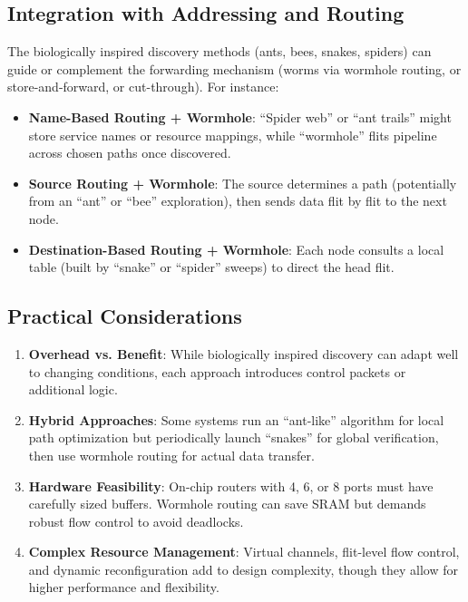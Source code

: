 \documentclass[../../../OAE-SPEC-MAIN.tex]{subfiles}
\begin{document}
\subsection*{Integration with Addressing and Routing}

The biologically inspired discovery methods (ants, bees, snakes, spiders) can guide or complement the forwarding mechanism (worms via wormhole routing, or store-and-forward, or cut-through). For instance:

\begin{itemize}
    \item \textbf{Name-Based Routing + Wormhole}: “Spider web” or “ant trails” might store service names or resource mappings, while “wormhole” flits pipeline across chosen paths once discovered.
    \item \textbf{Source Routing + Wormhole}: The source determines a path (potentially from an “ant” or “bee” exploration), then sends data flit by flit to the next node.
    \item \textbf{Destination-Based Routing + Wormhole}: Each node consults a local table (built by “snake” or “spider” sweeps) to direct the head flit.
\end{itemize}

\subsection*{Practical Considerations}
\begin{enumerate}
    \item \textbf{Overhead vs. Benefit}: While biologically inspired discovery can adapt well to changing conditions, each approach introduces control packets or additional logic.
    \item \textbf{Hybrid Approaches}: Some systems run an “ant-like” algorithm for local path optimization but periodically launch “snakes” for global verification, then use wormhole routing for actual data transfer.
    \item \textbf{Hardware Feasibility}: On-chip routers with 4, 6, or 8 ports must have carefully sized buffers. Wormhole routing can save SRAM but demands robust flow control to avoid deadlocks.
    \item \textbf{Complex Resource Management}: Virtual channels, flit-level flow control, and dynamic reconfiguration add to design complexity, though they allow for higher performance and flexibility.
\end{enumerate}
\end{document}
